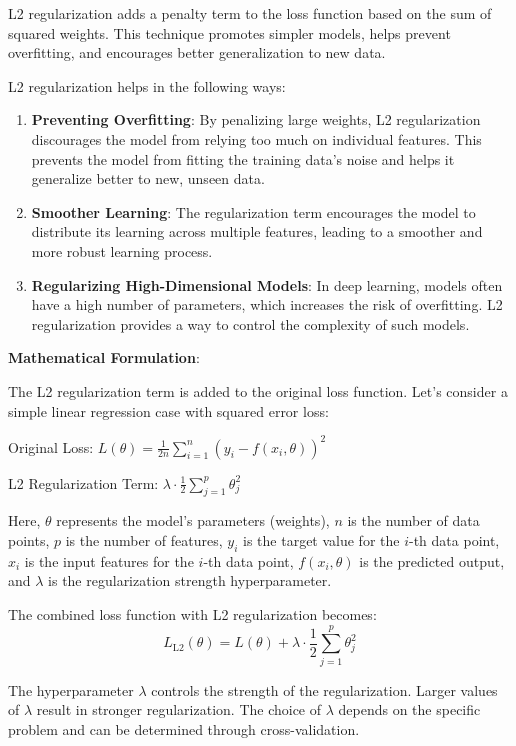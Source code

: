\documentclass{report}
\begin{document}
L2 regularization adds a penalty term to the loss function based on the sum of squared weights. This technique promotes simpler models, helps prevent overfitting, and encourages better generalization to new data.

L2 regularization helps in the following ways:

\begin{enumerate}
\item \textbf{Preventing Overfitting}: By penalizing large weights, L2 regularization discourages the model from relying too much on individual features. This prevents the model from fitting the training data's noise and helps it generalize better to new, unseen data.

\item \textbf{Smoother Learning}: The regularization term encourages the model to distribute its learning across multiple features, leading to a smoother and more robust learning process.

\item \textbf{Regularizing High-Dimensional Models}: In deep learning, models often have a high number of parameters, which increases the risk of overfitting. L2 regularization provides a way to control the complexity of such models.
\end{enumerate}
\textbf{Mathematical Formulation}:

The L2 regularization term is added to the original loss function. Let's consider a simple linear regression case with squared error loss:

Original Loss: \( L(\theta) = \frac{1}{2n} \sum_{i=1}^{n} (y_i - f(x_i, \theta))^2 \)

L2 Regularization Term: \( \lambda \cdot \frac{1}{2} \sum_{j=1}^{p} \theta_j^2 \)

Here, \( \theta \) represents the model's parameters (weights), \( n \) is the number of data points, \( p \) is the number of features, \( y_i \) is the target value for the \( i \)-th data point, \( x_i \) is the input features for the \( i \)-th data point, \( f(x_i, \theta) \) is the predicted output, and \( \lambda \) is the regularization strength hyperparameter.

The combined loss function with L2 regularization becomes:
\[ L_\text{L2}(\theta) = L(\theta) + \lambda \cdot \frac{1}{2} \sum_{j=1}^{p} \theta_j^2 \]

The hyperparameter \( \lambda \) controls the strength of the regularization. Larger values of \( \lambda \) result in stronger regularization. The choice of \( \lambda \) depends on the specific problem and can be determined through cross-validation.
\end{document}
